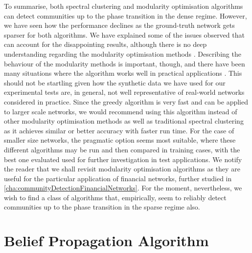 To summarise, both spectral clustering and modularity optimisation algorithms can detect communities up to the phase transition in the dense regime.
However, we have seen how the performance declines as the ground-truth network gets sparser for both algorithms.
We have explained some of the issues observed that can account for the disappointing results, although there is no deep understanding regarding the modularity optimisation methods \cite{For10}.
Describing the behaviour of the modularity methods is important, though, and there have been many situations where the algorithm works well in practical applications \cite{New06a,New06b,For10,GMC10}.
This should not be startling given how the synthetic data we have used for our experimental tests are, in general, not well representative of real-world networks considered in practice.
Since the greedy algorithm is very fast and can be applied to larger scale networks, we would recommend using this algorithm instead of other modularity optimisation methods as well as traditional spectral clustering as it achieves similar or better accuracy with faster run time.
For the case of smaller size networks, the pragmatic option seems most suitable, where these different algorithms may be run and then compared in training cases, with the best one evaluated used for further investigation in test applications.
We notify the reader that we shall revisit modularity optimisation algorithms as they are useful for the particular application of financial networks, further studied in \cref{cha:communityDetectionFinancialNetworks}.
For the moment, nevertheless, we wish to find a class of algorithms that, empirically, seem to reliably detect communities up to the phase transition in the sparse regime also.


\section{Belief Propagation Algorithm}
\label{sec:beliefPropagationAlgorithmTest}



